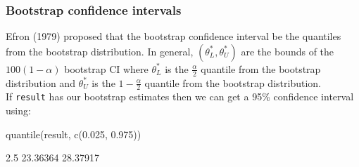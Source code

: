 \documentclass[a4paper]{article}\usepackage[]{graphicx}\usepackage[]{xcolor}
\begin{document}
\subsubsection{Bootstrap confidence intervals}
Efron (1979) proposed that the bootstrap confidence interval be the quantiles from the bootstrap distribution.
In general, \( (\theta_L^\ast, \theta_U^\ast) \) are the bounds of the \( 100(1-\alpha) \) bootstrap CI where \( \theta_L^\ast \) is the \( \frac{\alpha}{2} \) quantile from the bootstrap distribution and  \( \theta_U^\ast \) is the \( 1-\frac{\alpha}{2} \) quantile from the bootstrap distribution.\\
If \lstinline|result| has our bootstrap estimates then we can get a 95\% confidence interval using:
\begin{Schunk}
\begin{Sinput}
quantile(result, c(0.025, 0.975))
\end{Sinput}
\begin{Soutput}
    2.5%
23.36364 28.37917 
\end{Soutput}
\end{Schunk}
\end{document}
